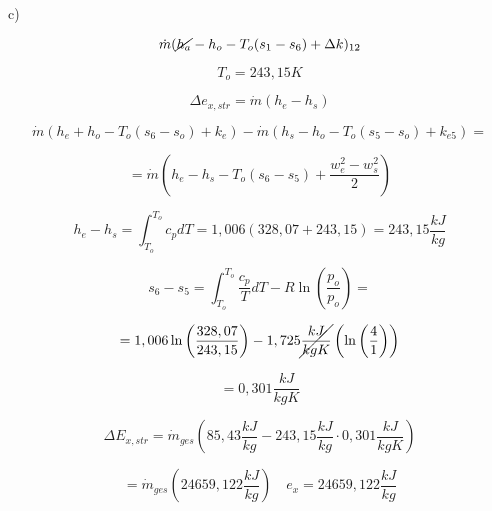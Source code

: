 c)

\[
\dot{m} (\cancel{h_a} - h_o - T_o (s_{1} - s_{6}) + \Delta k)_{12}
\]

\[
T_o = 243,15 K
\]

\[
\Delta e_{x,str} = \dot{m} (h_e - h_s)
\]

\[
\dot{m} \left( h_e + h_o - T_o (s_6 - s_o) + k_e \right) - \dot{m} \left( h_s - h_o - T_o (s_5 - s_o) + k_{e5} \right) =
\]

\[
= \dot{m} \left( h_e - h_s - T_o (s_6 - s_5) + \frac{w_{e}^{2} - w_{s}^{2}}{2} \right)
\]

\[
h_e - h_s = \int_{T_o}^{T_o} c_p dT = 1,006 \left( 328,07 + 243,15 \right) = 243,15 \frac{kJ}{kg}
\]

\[
s_6 - s_5 = \int_{T_o}^{T_o} \frac{c_p}{T} dT - R \ln \left( \frac{p_o}{p_o} \right) =
\]

\[
= 1,006 \ln \left( \frac{328,07}{243,15} \right) - 1,725 \cancel{\frac{kJ}{kgK}} \left( \ln \left( \frac{4}{1} \right) \right)
\]

\[
= 0,301 \frac{kJ}{kgK}
\]

\[
\Delta E_{x,str} = \dot{m}_{ges} \left( 85,43 \frac{kJ}{kg} - 243,15 \frac{kJ}{kg} \cdot 0,301 \frac{kJ}{kgK} \right)
\]

\[
= \dot{m}_{ges} \left( 24659,122 \frac{kJ}{kg} \right) \quad e_x = 24659,122 \frac{kJ}{kg}
\]